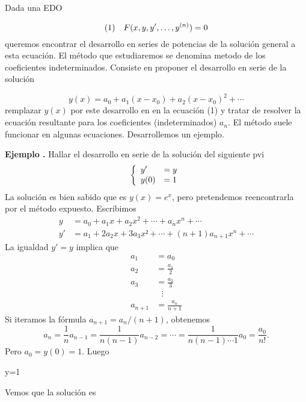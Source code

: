 \documentclass{article}
\newcounter{ejem_cont}\stepcounter{ejem_cont}
\newenvironment{ejemplo}[1]{\vspace{1ex}\noindent\textbf{Ejemplo \arabic{ejem_cont}.} #1}{\stepcounter{ejem_cont}}
\renewcommand{\emph}[1]{\textcolor[rgb]{0,0,1}{#1}}
\begin{document}
Dada una EDO

\begin{equation} \hbox{(1)}\quad  F(x,y,y',\ldots,y^{(n)})=0\end{equation}
queremos encontrar el desarrollo en series de potencias de la solución general a esta ecuación. El método que estudiaremos se denomina \emph{metodo de los coeficientes indeterminados}. Consiste en proponer el desarrollo en serie de la solución

\[y(x)=a_0+a_1(x-x_0)+a_2(x-x_0)^2+\cdots  \]
remplazar $y(x)$ por este desarrollo en  en la ecuación (1) y tratar de resolver la ecuación resultante para los coeficientes (indeterminados) $a_n$. El método suele funcionar en algunas ecuaciones. Desarrollemos un ejemplo.

 

\begin{ejemplo} Hallar el desarrollo en serie de la solución del siguiente pvi 
\[\left\{\begin{array}{l l} y'&=y\\ y(0)&=1\end{array}\right.\]
La solución es bien sabido que es $y(x)=e^x$,  pero pretendemos reencontrarla por el método expuesto. Escribimos
\[\begin{split}
   y&=a_0+a_1x+a_2x^2+\cdots+a_nx^n+\cdots\\
   y'&=a_1+2a_2x+3a_3x²+\cdots+(n+1)a_{n+1}x^n+\cdots
  \end{split}
\]
La igualdad $y'=y$ implica que 
\[\begin{split}
   a_1&=a_0\\
   a_2&=\frac{a_1}{2}\\
   a_3&=\frac{a_2}{3}\\
      &\,\,\,\,\vdots \\
   a_{n+1}&=\frac{a_{n}}{n+1}
 \end{split}
\]
Si iteramos la fórmula $a_{n+1}=a_{n}/(n+1)$, obtenemos 
\[a_n=\frac{1}{n}a_{n-1}=\frac{1}{n(n-1)}a_{n-2}=\cdots=\frac{1}{n(n-1)\cdots 1}a_{0}=\frac{a_0}{n!}.\]
Pero $a_0=y(0)=1$. Luego 


\begin{sageblock}
y=1 
\end{sageblock}

Vemos que la solución es 


\end{ejemplo}
\end{document}
